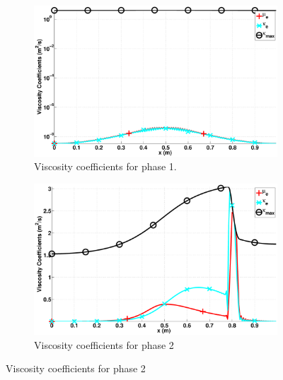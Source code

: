 \documentclass[preprint,10pt]{elsarticle}
\begin{document}
%
\begin{figure}[H]
        \centering
        \begin{subfigure}[b]{0.495\textwidth}
                \centering
                \includegraphics[width=\textwidth]{figures/nozzle-indep-phase_liquid_viscosity_kappa_mu.eps}
                \caption{Viscosity coefficients for phase 1.}
                \label{fig:nozzle-indep-visc-coeff-phase-1}
        \end{subfigure}%
        \begin{subfigure}[b]{0.495\textwidth}
                \centering
                \includegraphics[width=\textwidth]{figures/nozzle-indep-phase_vapor_viscosity_kappa_mu.eps}
                \caption{Viscosity coefficients for phase 2}
                \label{fig:nozzle-indep-visc-coeff-phase-2}
        \end{subfigure}
        

\end{figure}
\end{document}

